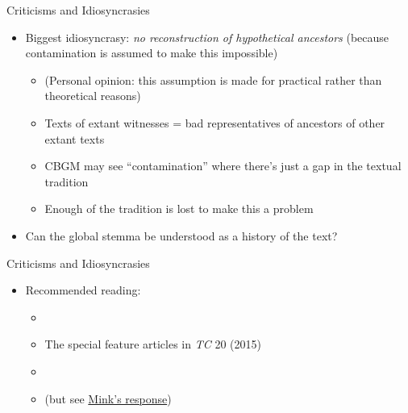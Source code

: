 \documentclass[10pt]{beamer}
\begin{document}
	\begin{frame}{Criticisms and Idiosyncrasies}
		\begin{itemize}
			\item Biggest idiosyncrasy: \emph{no reconstruction of hypothetical ancestors} (because contamination is assumed to make this impossible)
			\begin{itemize}
				\item (Personal opinion: this assumption is made for practical rather than theoretical reasons)
				\item Texts of extant witnesses = bad representatives of ancestors of other extant texts
				\item CBGM may see ``contamination'' where there's just a gap in the textual tradition
				\item Enough of the tradition is lost to make this a problem
			\end{itemize}
			\item Can the global stemma be understood as a history of the text?
		\end{itemize}
	\end{frame}
	\begin{frame}{Criticisms and Idiosyncrasies}
		\begin{itemize}
			\item Recommended reading:
			\begin{itemize}
				\item \cite{Jongkind14}
				\item The special feature articles in \emph{TC} 20 (2015)
				\item \cite{Gurry18}
				\item \cite{Carlson20} (but see \href{http://ntvmr.uni-muenster.de/en_US/intfblog/-/blogs/remarks-on-carlson-a-bias-at-the-heart-of-the-cbgm-guest-post-by-gerd-mink-}{Mink's response})
			\end{itemize}
		\end{itemize}
	\end{frame}
\end{document}
